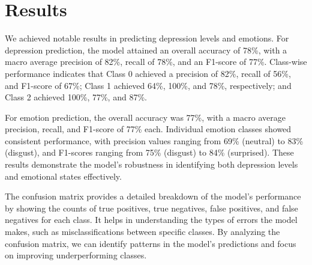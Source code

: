 
\chapter{Results}

We achieved notable results in predicting depression levels and emotions. For depression prediction, the model attained an overall accuracy of 78\%, with a macro average precision of 82\%, recall of 78\%, and an F1-score of 77\%. Class-wise performance indicates that Class 0 achieved a precision of 82\%, recall of 56\%, and F1-score of 67\%; Class 1 achieved 64\%, 100\%, and 78\%, respectively; and Class 2 achieved 100\%, 77\%, and 87\%.

For emotion prediction, the overall accuracy was 77\%, with a macro average precision, recall, and F1-score of 77\% each. Individual emotion classes showed consistent performance, with precision values ranging from 69\% (neutral) to 83\% (disgust), and F1-scores ranging from 75\% (disgust) to 84\% (surprised). These results demonstrate the model's robustness in identifying both depression levels and emotional states effectively.

The confusion matrix provides a detailed breakdown of the model's performance by showing the counts of true positives, true negatives, false positives, and false negatives for each class. It helps in understanding the types of errors the model makes, such as misclassifications between specific classes. By analyzing the confusion matrix, we can identify patterns in the model's predictions and focus on improving underperforming classes.
